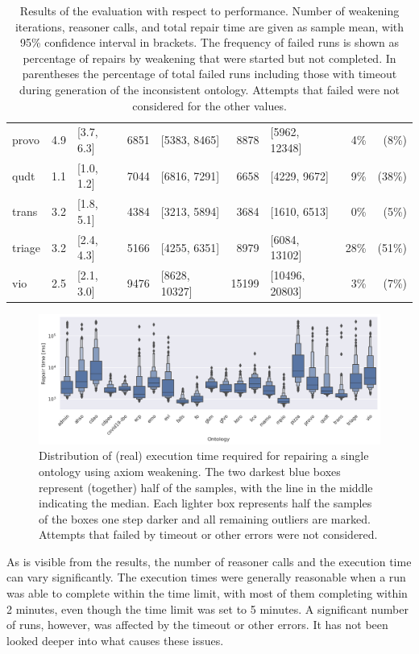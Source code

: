 \begin{table}[ht]
\begin{tabular}{|l|r@{ }lr@{ }lr@{ }lr@{ }r|}
    provo & 4.9 & [3.7, 6.3] & 6851 & [5383, 8465] & 8878 & [5962, 12348] & 4\% & (8\%) \\
    qudt & 1.1 & [1.0, 1.2] & 7044 & [6816, 7291] & 6658 & [4229, 9672] & 9\% & (38\%) \\
    trans & 3.2 & [1.8, 5.1] & 4384 & [3213, 5894] & 3684 & [1610, 6513] & 0\% & (5\%) \\
    triage & 3.2 & [2.4, 4.3] & 5166 & [4255, 6351] & 8979 & [6084, 13102] & 28\% & (51\%) \\
    vio & 2.5 & [2.1, 3.0] & 9476 & [8628, 10327] & 15199 & [10496, 20803] & 3\% & (7\%) \\
    \hline
  \end{tabular}
  \caption{Results of the evaluation with respect to performance. Number of weakening iterations, reasoner calls, and total repair time are given as sample mean, with 95\% confidence interval in brackets. The frequency of failed runs is shown as percentage of repairs by weakening that were started but not completed. In parentheses the percentage of total failed runs including those with timeout during generation of the inconsistent ontology. Attempts that failed were not considered for the other values.}
  \label{table:results-perf}
\end{table}

\begin{figure}[ht]
  \centering
  \includegraphics[width=\textwidth]{resources/time-ontology-violin.png}
  \caption{Distribution of (real) execution time required for repairing a single ontology using axiom weakening. The two darkest blue boxes represent (together) half of the samples, with the line in the middle indicating the median. Each lighter box represents half the samples of the boxes one step darker and all remaining outliers are marked. Attempts that failed by timeout or other errors were not considered.}
  \label{fig:results-perf-time}
\end{figure}

As is visible from the results, the number of reasoner calls and the execution time can vary significantly. The execution times were generally reasonable when a run was able to complete within the time limit, with most of them completing within 2 minutes, even though the time limit was set to 5 minutes. A significant number of runs, however, was affected by the timeout or other errors. It has not been looked deeper into what causes these issues.

